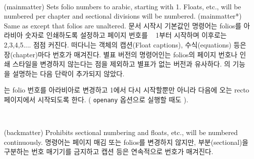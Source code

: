 \begin{syntax}
\cmd{\mainmatter} \cmd{\mainmatter*} \\
\end{syntax}
\glossary(mainmatter)%
  {}%
  {Sets folio numbers to arabic, starting with 1. Floats, etc., will be
   numbered per chapter and sectional divisions will be numbered.}
\glossary(mainmatter*)%
  {}%
  {Same as  except that folios are unaltered.}
문서 시작시 기본값인 \cmd{\mainmatter} 명령어는 folios를 아라비아 숫자로 인쇄하도록 설정하고 페이지 번호를 ~ 1부터 시작하며 이후로는 2,3,4,5.... 점점 커진다.
떠다니는 객체의 캡션(Float captions), 수식(equations) 등은 장(chapter)마다 번호가 매겨진다. 별표 버전의 명령어인\cmd{\mainmatter*}는 folios의 페이지 번호나 인쇄 스타일을 변경하지 않는다는 점을 제외하고 별표가 없는 버전과 유사하다.
의 기능을 설명하는 다음 단락이 추가되지 않았다.

\cmd{\mainmatter} 는 folio 번호를 아라비아로 변경하고 1에서 다시 시작할뿐만 아니라 다음에 오는 recto 페이지에서 시작되도록 한다. ( \texttt{openany}  옵션으로 실행할 때도 ).




\begin{syntax}
\cmd{\backmatter} \\
\end{syntax}
\glossary(backmatter)%
  {}%
  {Prohibits sectional numbering and floats, etc., will be numbered continuously.}
\cmd{\backmatter} 명령어는 페이지 매김 또는 folios를 변경하지 않지만, 부분(sectional)을 구분하는 번호 매기기를 금지하고 캡션 등은 연속적으로 번호가 매겨진다.

